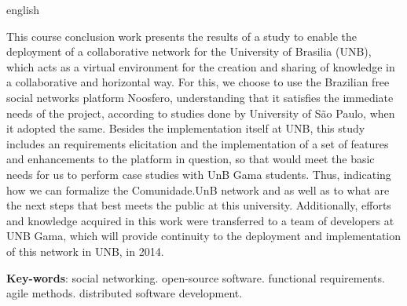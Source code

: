 \begin{resumo}[Abstract]
  \begin{otherlanguage*}{english}  

  This course conclusion work presents the results of a study to enable the
  deployment of a collaborative network for the University of
  Brasilia (UNB), which acts as a virtual environment for the creation and
  sharing of knowledge in a collaborative and horizontal way.
  For this, we choose to use the Brazilian free social networks platform
  Noosfero, understanding that it satisfies the immediate needs of the
  project, according to studies done by University of São Paulo, when it
  adopted the same.
  Besides the implementation itself at UNB, this study includes an requirements
  elicitation and the implementation of a set of features and enhancements to
  the platform in question, so that would meet the basic needs for us to perform
  case studies with UnB Gama students.
  Thus, indicating how we can formalize the Comunidade.UnB network and
  as well as to what are the next steps that best meets the public at this
  university.
  Additionally, efforts and knowledge acquired in this work were transferred
  to a team of developers at UNB Gama, which will provide continuity to the
  deployment and implementation of this network in UNB, in 2014.
   

  \vspace{\onelineskip}
 
  \noindent 
  \textbf{Key-words}: social networking. open-source software. functional requirements. agile methods. distributed software development.
  \end{otherlanguage*}
\end{resumo}
